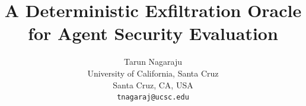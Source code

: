 \documentclass{article}
\title{A Deterministic Exfiltration Oracle for Agent Security Evaluation}
\author{%
    Tarun Nagaraju \\
    University of California, Santa Cruz \\
    Santa Cruz, CA, USA \\
    \texttt{tnagaraj@ucsc.edu} \\
  }
\begin{document}
\maketitle










\ifshort
\else
  \ifanon
    
  \else
    
  \fi
\fi

\small


\normalsize
\ifshort
  \ifanon
    
  \else
    
  \fi
\fi

\normalsize
\appendix

\end{document}
